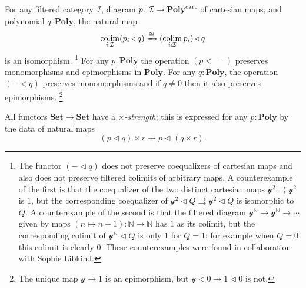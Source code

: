 \documentclass[11pt, one side, article]{memoir}
\theoremstyle{definition}
\theoremstyle{plain}
\DeclareMathOperator*{\colim}{colim}
\newcommand{\cat}[1]{\mathcal{#1}}%
\newcommand{\Cat}[1]{\mathbf{#1}}%
\newcommand{\tto}{\rightrightarrows}
\newcommand{\To}[2][]{\xrightarrow[#1]{\tn{$#2$}}}
\newcommand{\tn}[1]{\textnormal{#1}}
\newcommand{\nn}{\mathbb{N}}
\newcommand{\smset}{\Cat{Set}}
\newcommand{\yon}{{\mathcal{y}}}
\newcommand{\poly}{\Cat{Poly}}
\newcommand{\polycart}{\poly^{\tn{cart}}}
\newcommand{\0}{\textsf{0}}
\newcommand{\1}{\tn{\textsf{1}}}
\newcommand{\tri}{\mathbin{\triangleleft}}
\begin{document}
For any filtered category $\cat{I}$, diagram $p\colon \cat{I}\to\polycart$ of cartesian maps, and polynomial $q:\poly$, the natural map
\begin{equation}\label{eqn.cart_tri}
	\colim_{i: \cat{I}}(p_i\tri q)
	\To{\cong}
	(\colim_{i: \cat{I}}p_i)\tri q
\end{equation}
is an isomorphism.%
\footnote{The functor $(-\tri q)$ does not preserve coequalizers of cartesian maps and also does not preserve filtered colimits of arbitrary maps. A counterexample of the first is that the coequalizer of the two distinct cartesian maps $\yon^2\tto\yon^2$ is $1$, but the corresponding coequalizer of $\yon^2\tri Q\tto \yon^2\tri Q$ is isomorphic to $Q$. A counterexample of the second is that the filtered diagram $\yon^\nn\to\yon^\nn\to\cdots$ given by maps $(n\mapsto n+1)\colon\nn\to\nn$ has $1$ as its colimit, but the corresponding colimit of $\yon^\nn\tri Q$ is only $1$ for $Q=1$; for example when $Q=0$ this colimit is clearly $0$. These counterexamples were found in collaboration with Sophie Libkind.
}
 For any $p:\poly$ the operation $(p\tri\,-)$ preserves monomorphisms and epimorphisms in $\poly$. For any $q:\poly$, the operation $(-\tri q)$ preserves monomorphisms and if $q\neq 0$ then it also preserves epimorphisms.%
\footnote{The unique map $\yon\to 1 $ is an epimorphism, but $\yon\tri 0\to 1\tri 0$ is not.}

All functors $\smset\to\smset$ have a \emph{$\times$-strength}; this is expressed for any $p:\poly$ by the data of natural maps
\begin{equation}\label{eqn.strength}
	(p\tri q)\times r\to p\tri(q\times r).
\end{equation}
\end{document}
